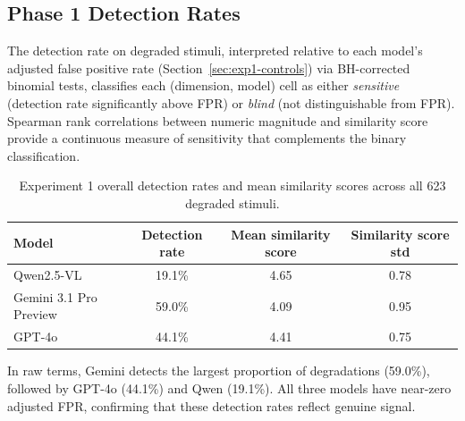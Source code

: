 \subsection{Phase 1 Detection Rates} \label{sec:phase1-detection}

The detection rate on degraded stimuli, interpreted relative to each model's adjusted false positive rate (Section~\ref{sec:exp1-controls}) via BH-corrected binomial tests, classifies each (dimension, model) cell as either \textit{sensitive} (detection rate significantly above FPR) or \textit{blind} (not distinguishable from FPR). Spearman rank correlations between numeric magnitude and similarity score provide a continuous measure of sensitivity that complements the binary classification.

\begin{table}[htbp]
\centering
\caption{Experiment 1 overall detection rates and mean similarity scores across all 623 degraded stimuli.}
\label{tab:exp1-overall}
\begin{tabular}{lccc}
\toprule
Model & Detection rate & Mean similarity score & Similarity score std \\
\midrule
Qwen2.5-VL              & 19.1\% & 4.65 & 0.78 \\
Gemini 3.1 Pro Preview  & 59.0\% & 4.09 & 0.95 \\
GPT-4o                  & 44.1\% & 4.41 & 0.75 \\
\bottomrule
\end{tabular}
\end{table}

In raw terms, Gemini detects the largest proportion of degradations (59.0\%), followed by GPT-4o (44.1\%) and Qwen (19.1\%). All three models have near-zero adjusted FPR, confirming that these detection rates reflect genuine signal.

